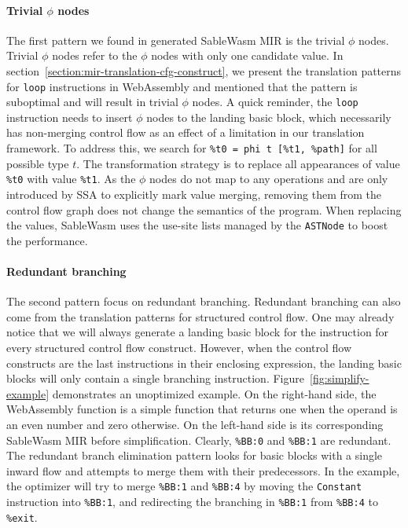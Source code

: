 \paragraph{Trivial $\phi$ nodes}
The first pattern we found in generated SableWasm MIR is the trivial $\phi$
nodes. Trivial $\phi$ nodes refer to the $\phi$ nodes with only one candidate
value. In section~\ref{section:mir-translation-cfg-construct}, we present the
translation patterns for \texttt{loop}
instructions in WebAssembly and mentioned that the pattern is suboptimal and
will result in trivial $\phi$ nodes. A quick reminder, the \texttt{loop}
instruction needs to insert $\phi$ nodes to the landing basic block, which
necessarily has non-merging control flow as an effect of a limitation in our
translation framework. To address this, we search for
\texttt{\%t0 = phi t [\%t1, \%path]} for all possible type $t$. The
transformation strategy is to replace all appearances of value \texttt{\%t0}
with value \texttt{\%t1}. As the $\phi$ nodes do not map to any operations
and are only introduced by SSA to explicitly mark value merging, removing them
from the control flow graph does not change the semantics of the program. When
replacing the values, SableWasm uses the use-site lists managed by the
\texttt{ASTNode} to boost the performance.

\paragraph{Redundant branching}
The second pattern focus on redundant branching. Redundant branching can also
come from the translation patterns for structured control flow. One may already
notice that we will always generate a landing basic block for the instruction
for every structured control flow construct. However, when the control flow
constructs are the last instructions in their enclosing expression, the landing
basic blocks will only contain a single branching instruction.
Figure~\ref{fig:simplify-example} demonstrates an unoptimized example. On the
right-hand side, the WebAssembly function is a simple function that returns one
when the operand is an even number and zero otherwise. On the left-hand side is
its corresponding SableWasm MIR before simplification. Clearly, \texttt{\%BB:0}
and \texttt{\%BB:1} are redundant. The redundant branch elimination pattern
looks for basic blocks with a single inward flow and attempts to merge them
with their predecessors. In the example, the optimizer will try to merge
\texttt{\%BB:1} and \texttt{\%BB:4} by moving the \texttt{Constant} instruction
into \texttt{\%BB:1}, and redirecting the branching in \texttt{\%BB:1} from
\texttt{\%BB:4} to \texttt{\%exit}.

